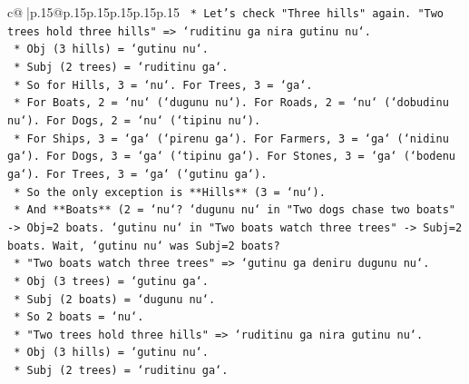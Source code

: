 \documentclass{article}
\begin{document}
{\begin{supertabular}{c@{$\;$}|p{.15\linewidth}@{}p{.15\linewidth}p{.15\linewidth}p{.15\linewidth}p{.15\linewidth}p{.15\linewidth}}
{{{\texttt{                                                    *   Let's check "Three hills" again. "Two trees hold three hills" => `ruditinu ga nira gutinu nu`.} \\
\texttt{                                                        *   Obj (3 hills) = `gutinu nu`.} \\
\texttt{                                                        *   Subj (2 trees) = `ruditinu ga`.} \\
\texttt{                                                    *   So for Hills, 3 = `nu`. For Trees, 3 = `ga`.} \\
\texttt{                                                    *   For Boats, 2 = `nu` (`dugunu nu`). For Roads, 2 = `nu` (`dobudinu nu`). For Dogs, 2 = `nu` (`tipinu nu`).} \\
\texttt{                                                    *   For Ships, 3 = `ga` (`pirenu ga`). For Farmers, 3 = `ga` (`nidinu ga`). For Dogs, 3 = `ga` (`tipinu ga`). For Stones, 3 = `ga` (`bodenu ga`). For Trees, 3 = `ga` (`gutinu ga`).} \\
\texttt{                                                    *   So the only exception is **Hills** (3 = `nu`).} \\
\texttt{                                                    *   And **Boats** (2 = `nu`? `dugunu nu` in "Two dogs chase two boats" {-}> Obj=2 boats. `gutinu nu` in "Two boats watch three trees" {-}> Subj=2 boats. Wait, `gutinu nu` was Subj=2 boats?} \\
\texttt{                                                        *   "Two boats watch three trees" => `gutinu ga deniru dugunu nu`.} \\
\texttt{                                                            *   Obj (3 trees) = `gutinu ga`.} \\
\texttt{                                                            *   Subj (2 boats) = `dugunu nu`.} \\
\texttt{                                                        *   So 2 boats = `nu`.} \\
\texttt{                                                        *   "Two trees hold three hills" => `ruditinu ga nira gutinu nu`.} \\
\texttt{                                                            *   Obj (3 hills) = `gutinu nu`.} \\
\texttt{                                                            *   Subj (2 trees) = `ruditinu ga`.} \\
}}}
\end{supertabular}}
\end{document}
